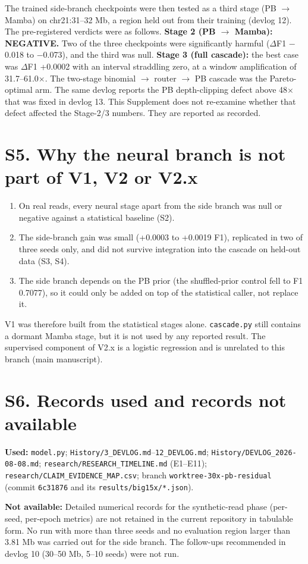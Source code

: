 \documentclass[11pt,a4paper]{article}
\newcommand{\src}[1]{{\small\texttt{#1}}}
\begin{document}
The trained side-branch checkpoints were then tested as a third stage (PB $\rightarrow$ Mamba)
on chr21:31--32 Mb, a region held out from their training (devlog 12). The pre-registered
verdicts were as follows. \textbf{Stage 2 (PB $\rightarrow$ Mamba): NEGATIVE.} Two of the
three checkpoints were significantly harmful ($\Delta$F1 $-$0.018 to $-$0.073), and the third was
null. \textbf{Stage 3 (full cascade):} the best case was $\Delta$F1 +0.0002 with an interval
straddling zero, at a window amplification of 31.7--61.0$\times$. The two-stage
binomial $\rightarrow$ router $\rightarrow$ PB cascade was the Pareto-optimal arm. The same
devlog reports the PB depth-clipping defect above 48$\times$ that was fixed in devlog 13. This Supplement does not
re-examine whether that defect affected the Stage-2/3 numbers. They are reported as recorded.

\section{S5. Why the neural branch is not part of V1, V2 or V2.x}

\begin{enumerate}[leftmargin=1.6em,itemsep=1pt]
\item On real reads, every neural stage apart from the side branch was null or negative against
  a statistical baseline (S2).
\item The side-branch gain was small (+0.0003 to +0.0019 F1), replicated in two of three seeds
  only, and did not survive integration into the cascade on held-out data (S3, S4).
\item The side branch depends on the PB prior (the shuffled-prior control fell to F1 0.7077), so
  it could only be added on top of the statistical caller, not replace it.
\end{enumerate}
V1 was therefore built from the statistical stages alone. \src{cascade.py} still contains a
dormant Mamba stage, but it is not used by any reported result. The supervised component of
V2.x is a logistic regression and is unrelated to this branch (main manuscript).

\section{S6. Records used and records not available}

\textbf{Used:} \src{model.py}; \src{History/3\_DEVLOG.md}--\src{12\_DEVLOG.md};
\src{History/DEVLOG\_2026-08-08.md}; \src{research/RESEARCH\_TIMELINE.md} (E1--E11);
\src{research/CLAIM\_EVIDENCE\_MAP.csv}; branch \src{worktree-30x-pb-residual} (commit
\src{6c31876} and its \src{results/big15x/*.json}).

\textbf{Not available:} Detailed numerical records for the synthetic-read phase (per-seed,
per-epoch metrics) are not retained in the current repository in tabulable form. No run with
more than three seeds and no evaluation region larger than 3.81 Mb was carried out for the side
branch. The follow-ups recommended in devlog 10 (30--50 Mb, 5--10 seeds) were not run.
\end{document}
